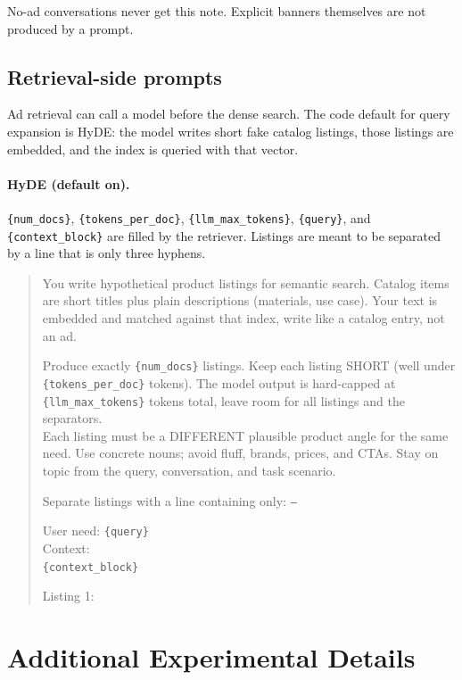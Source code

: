 \documentclass[english]{article}
\begin{document}
No-ad conversations never get this note. Explicit banners themselves are not produced by a prompt.

\subsection{Retrieval-side prompts}

Ad retrieval can call a model before the dense search. The code default for query expansion is HyDE: the model writes short fake catalog listings, those listings are embedded, and the index is queried with that vector.

\paragraph{HyDE (default on).}
\texttt{\{num\_docs\}}, \texttt{\{tokens\_per\_doc\}}, \texttt{\{llm\_max\_tokens\}}, \texttt{\{query\}}, and \texttt{\{context\_block\}} are filled by the retriever. Listings are meant to be separated by a line that is only three hyphens.

\begin{quote}
You write hypothetical product listings for semantic search. Catalog items are short titles plus plain descriptions (materials, use case). Your text is embedded and matched against that index, write like a catalog entry, not an ad.

Produce exactly \texttt{\{num\_docs\}} listings. Keep each listing SHORT (well under \texttt{\{tokens\_per\_doc\}} tokens). The model output is hard-capped at \texttt{\{llm\_max\_tokens\}} tokens total, leave room for all listings and the separators.\\
Each listing must be a DIFFERENT plausible product angle for the same need. Use concrete nouns; avoid fluff, brands, prices, and CTAs. Stay on topic from the query, conversation, and task scenario.

Separate listings with a line containing only: \texttt{---}

User need: \texttt{\{query\}}\\
Context:\\
\texttt{\{context\_block\}}

Listing 1:
\end{quote}

\section{Additional Experimental Details}
\end{document}
